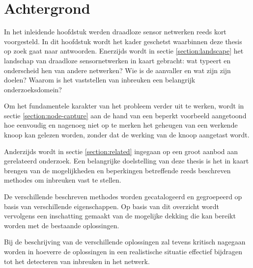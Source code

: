 
\chapter{Achtergrond}
\label{chapter:achtergrond}

In het inleidende hoofdstuk werden draadloze sensor netwerken reeds kort
voorgesteld. In dit hoofdstuk wordt het kader geschetst waarbinnen deze thesis
op zoek gaat naar antwoorden. Enerzijds wordt in sectie \ref{section:landscape}
het landschap van draadloze sensornetwerken in kaart gebracht: wat typeert en
onderscheid hen van andere netwerken? Wie is de aanvaller en wat zijn zijn
doelen? Waarom is het vaststellen van inbreuken een belangrijk onderzoeksdomein?

Om het fundamentele karakter van het probleem verder uit te werken, wordt in
sectie \ref{section:node-capture} aan de hand van een beperkt voorbeeld
aangetoond hoe eenvoudig en nagenoeg niet op te merken het geheugen van een
werkende knoop kan gelezen worden, zonder dat de werking van de knoop aangetast
wordt.

Anderzijds wordt in sectie \ref{section:related} ingegaan op een groot aanbod
aan gerelateerd onderzoek. Een belangrijke doelstelling van deze thesis is het
in kaart brengen van de mogelijkheden en beperkingen betreffende reeds
beschreven methodes om inbreuken vast te stellen.

De verschillende beschreven methodes worden gecatalogeerd en gegroepeerd op
basis van verschillende eigenschappen. Op basis van dit overzicht wordt
vervolgens een inschatting gemaakt van de mogelijke dekking die kan bereikt
worden met de bestaande oplossingen.

Bij de beschrijving van de verschillende oplossingen zal tevens kritisch
nagegaan worden in hoeverre de oplossingen in een realistische situatie
effectief bijdragen tot het detecteren van inbreuken in het netwerk.






